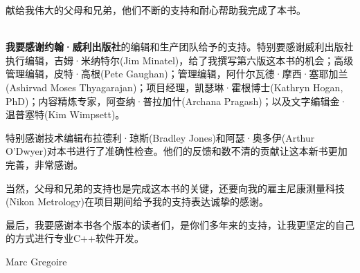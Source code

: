 献给我伟大的父母和兄弟，他们不断的支持和耐心帮助我完成了本书。

\hspace*{\fill} \\

\textbf{我要感谢约翰·威利出版社}的编辑和生产团队给予的支持。特别要感谢威利出版社执行编辑，吉姆·米纳特尔(Jim Minatel)，给了我撰写第六版这本书的机会；高级管理编辑，皮特·高根(Pete Gaughan)；管理编辑，阿什尔瓦德·摩西·塞耶加兰(Ashirvad Moses Thyagarajan)；项目经理，凯瑟琳·霍根博士(Kathryn Hogan, PhD)；内容精炼专家，阿查纳·普拉加什(Archana Pragash)；以及文字编辑金·温普塞特(Kim Wimpsett)。

特别感谢技术编辑布拉德利·琼斯(Bradley Jones)和阿瑟·奥多伊(Arthur O’Dwyer)对本书进行了准确性检查。他们的反馈和数不清的贡献让这本新书更加完善，非常感谢。

当然，父母和兄弟的支持也是完成这本书的关键，还要向我的雇主尼康测量科技(Nikon Metrology)在项目期间给予我的支持表达诚挚的感谢。

最后，我要感谢本书各个版本的读者们，是你们多年来的支持，让我更坚定的自己的方式进行专业C++软件开发。

\begin{flushright}
Marc Gregoire
\end{flushright}